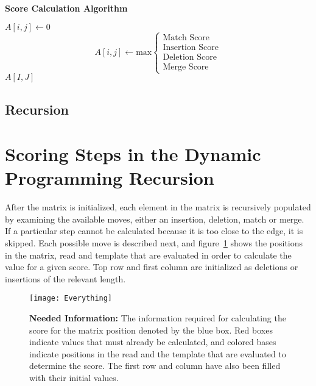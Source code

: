 \documentclass[paper=a4, fontsize=11pt]{scrartcl}
\numberwithin{equation}{section}		%
\numberwithin{figure}{section}			%
\numberwithin{table}{section}				%
\begin{document}
\begin{algorithm}
\caption*{\textbf{Score Calculation Algorithm}}
\label{calcScore}
\begin{algorithmic}[h]
\STATE $A[i,j] \leftarrow 0$
\ELSE
\STATE \[
	A[i,j]  \leftarrow \text{max}
\begin{cases}
\text{Match Score} \\
\text{Insertion Score} \\
	\text{Deletion Score} \\
   		\text{Merge Score} \end{cases}
\]
\ENDIF	
\ENDFOR
\ENDFOR
\RETURN $A[I,J]$
\end{algorithmic}
\end{algorithm}


\subsection*{Recursion}



\section{Scoring Steps in the Dynamic Programming Recursion}
After the matrix is initialized, each element in the matrix is recursively populated by examining the available moves, either an insertion, deletion, match or merge.  If a particular step cannot be calculated because it is too close to the edge, it is skipped.  Each possible move is described next, and figure~\ref{fig:everything} shows the positions in the matrix, read and template that are evaluated in order to calculate the value for a given score.  Top row and first column are initialized as deletions or insertions of the relevant length.


\begin{figure}[H] %
	\texttt{[image: Everything]}
		\caption{\textbf{Needed Information:} The information required for calculating the score for the matrix position denoted by the blue box.  Red boxes indicate values that must already be calculated, and colored bases indicate positions in the read and the template that are evaluated to determine the score.  The first row and column have also been filled with their initial values.}		
		\label{fig:everything}		
\end{figure}
\end{document}
